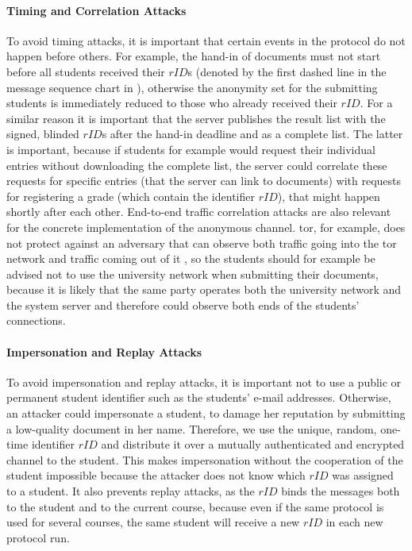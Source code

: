 \paragraph{Timing and Correlation Attacks}
To avoid timing attacks, it is important that certain events in the
protocol do not happen before others. For example, the hand-in of
documents must not start before all students received their $rID$s
(denoted by the first dashed line in the message sequence chart in
), otherwise the anonymity set for the
submitting students is immediately reduced to those who already received
their $rID$. 
For a similar reason it is important that the server publishes the
result list with the signed, blinded $rID$s after the hand-in deadline
and as a complete list. The latter is important, because if students for
example would request their individual entries without downloading the
complete list, the server could correlate these requests for specific
entries (that the server can link to documents) with requests for
registering a grade (which contain the identifier $rID$), that might
happen shortly after each other.
%
End-to-end traffic correlation attacks are also relevant for the concrete
implementation of the anonymous channel. \acs{tor}, for example, does not
protect against an adversary that can observe both traffic going into
the \acs{tor} network and traffic coming out of it \cite{dingledine_tor_2004},
so the students should for example be advised not to use the university
network when submitting their documents, because it is likely that the
same party operates both the university network and the system server
and therefore could observe both ends of the students' connections.


\paragraph{Impersonation and Replay Attacks}
To avoid impersonation and replay attacks, it is important not to use a
public or permanent student identifier such as the students' e-mail
addresses. Otherwise, an attacker could
impersonate a student, \eg to damage her reputation by submitting
a low-quality document in her name. Therefore, we use the 
unique, random, one-time identifier $rID$ and distribute it over a
mutually authenticated and encrypted channel to the student. This makes 
impersonation without the cooperation of the student impossible because
the attacker does not know which $rID$ was assigned to a 
student. It also prevents replay attacks,
as the $rID$ binds the messages both to the student and to the 
current course, because even if the same protocol is used for several
courses, the same student will receive a new $rID$
in each new protocol run.

